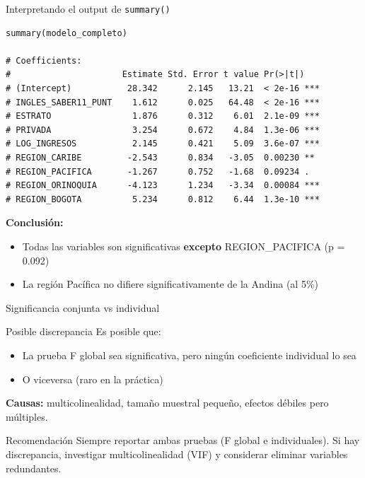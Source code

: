 \documentclass[aspectratio=169, 11pt]{beamer}
\begin{document}
\begin{frame}[fragile]{Interpretando el output de \texttt{summary()}}
\begin{lstlisting}
summary(modelo_completo)

# Coefficients:
#                      Estimate Std. Error t value Pr(>|t|)
# (Intercept)           28.342      2.145   13.21  < 2e-16 ***
# INGLES_SABER11_PUNT    1.612      0.025   64.48  < 2e-16 ***
# ESTRATO                1.876      0.312    6.01  2.1e-09 ***
# PRIVADA                3.254      0.672    4.84  1.3e-06 ***
# LOG_INGRESOS           2.145      0.421    5.09  3.6e-07 ***
# REGION_CARIBE         -2.543      0.834   -3.05  0.00230 **
# REGION_PACIFICA       -1.267      0.752   -1.68  0.09234 .
# REGION_ORINOQUIA      -4.123      1.234   -3.34  0.00084 ***
# REGION_BOGOTA          5.234      0.812    6.44  1.3e-10 ***
\end{lstlisting}

\vspace{0.2cm}
\textbf{Conclusión:}
\begin{itemize}
  \item Todas las variables son significativas \textbf{excepto} REGION\_PACIFICA (p = 0.092)
  \item La región Pacífica no difiere significativamente de la Andina (al 5\%)
\end{itemize}
\end{frame}

\begin{frame}{Significancia conjunta vs individual}
\begin{alertblock}{Posible discrepancia}
Es posible que:
\begin{itemize}
  \item La prueba F global sea significativa, pero ning\'un coeficiente individual lo sea
  \item O viceversa (raro en la pr\'actica)
\end{itemize}
\end{alertblock}

\vspace{0.1cm}
\textbf{Causas:} multicolinealidad, tama\~no muestral peque\~no, efectos d\'ebiles pero m\'ultiples.

\vspace{0.1cm}
\begin{block}{Recomendaci\'on}
Siempre reportar ambas pruebas (F global e individuales). Si hay discrepancia, investigar multicolinealidad (VIF) y considerar eliminar variables redundantes.
\end{block}
\end{frame}
\end{document}
